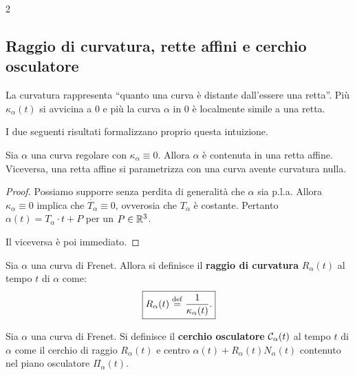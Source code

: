 \begin{multicols*}{2}
    \subsection{Raggio di curvatura, rette affini e cerchio osculatore}

    La curvatura rappresenta ``quanto una curva è distante dall'essere una retta''.
    Più $\kappa_\alpha(t)$ si avvicina a $0$ e più la curva $\alpha$ in $0$ è localmente
    simile a una retta. \smallskip

    I due seguenti risultati formalizzano proprio questa intuizione.

    \begin{proposition}
        Sia $\alpha$ una curva regolare con $\kappa_\alpha \equiv 0$. Allora
        $\alpha$ è contenuta in una retta affine. Viceversa, una retta affine
        si parametrizza con una curva avente curvatura nulla.
    \end{proposition}

    \begin{proof}
        Possiamo supporre senza perdita di generalità che $\alpha$ sia p.l.a. Allora
        $\kappa_\alpha \equiv 0$ implica che $\dot{T_\alpha} \equiv 0$, ovverosia
        che $T_\alpha$ è costante. Pertanto $\alpha(t) = T_\alpha \cdot t + P$ per un
        $P \in \mathbb{R}^3$. \smallskip

        Il viceversa è poi immediato.
    \end{proof}

    \begin{definition}
        Sia $\alpha$ una curva di Frenet. Allora si definisce il
        \textbf{raggio di curvatura} $R_\alpha(t)$ al tempo $t$ di $\alpha$
        come:
        \[
            \boxed{R_\alpha(t) \overset{\mathrm{def}}{=} \frac{1}{\kappa_\alpha(t)}.}
        \]
    \end{definition}

    \begin{definition}
        Sia $\alpha$ una curva di Frenet. Si definisce il
        \textbf{cerchio osculatore} $\mathcal{C}_\alpha(t)$ al tempo $t$ di $\alpha$ come
        il cerchio di raggio $R_\alpha(t)$ e centro $\alpha(t) + R_\alpha(t) N_\alpha(t)$ contenuto
        nel piano osculatore $\Pi_\alpha(t)$.
    \end{definition}


\end{multicols*}
